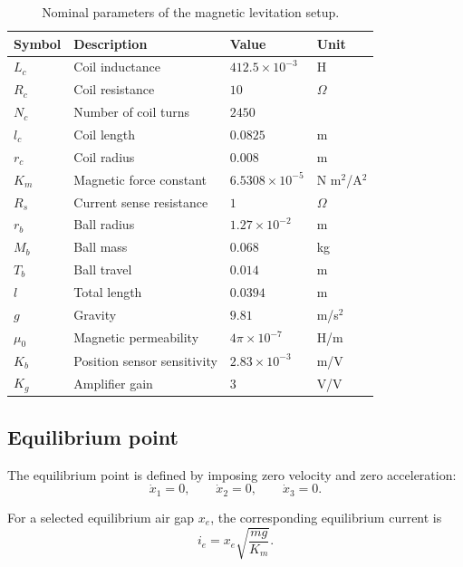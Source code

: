 \begin{table}[H]
\centering
\caption{Nominal parameters of the magnetic levitation setup.}
\label{tab:parameters}
\begin{tabular}{llll}
\toprule
Symbol & Description & Value & Unit \\
\midrule
$L_c$ & Coil inductance & $412.5\times10^{-3}$ & H \\
$R_c$ & Coil resistance & $10$ & $\Omega$ \\
$N_c$ & Number of coil turns & $2450$ &  \\
$l_c$ & Coil length & $0.0825$ & m \\
$r_c$ & Coil radius & $0.008$ & m \\
$K_m$ & Magnetic force constant & $6.5308\times10^{-5}$ & N m$^2$/A$^2$ \\
$R_s$ & Current sense resistance & $1$ & $\Omega$ \\
$r_b$ & Ball radius & $1.27\times10^{-2}$ & m \\
$M_b$ & Ball mass & $0.068$ & kg \\
$T_b$ & Ball travel & $0.014$ & m \\
$l$ & Total length & $0.0394$ & m \\
$g$ & Gravity & $9.81$ & m/s$^2$ \\
$\mu_0$ & Magnetic permeability & $4\pi\times10^{-7}$ & H/m \\
$K_b$ & Position sensor sensitivity & $2.83\times10^{-3}$ & m/V \\
$K_g$ & Amplifier gain & $3$ & V/V \\
\bottomrule
\end{tabular}
\end{table}

\subsection{Equilibrium point}

The equilibrium point is defined by imposing zero velocity and zero acceleration:
\begin{equation}
    \dot{x}_1 = 0, \qquad \dot{x}_2 = 0, \qquad \dot{x}_3 = 0.
\end{equation}

For a selected equilibrium air gap $x_e$, the corresponding equilibrium current is
\begin{equation}
    i_e = x_e \sqrt{\frac{m g}{K_m}}.
    \label{eq:equilibrium_current}
\end{equation}

